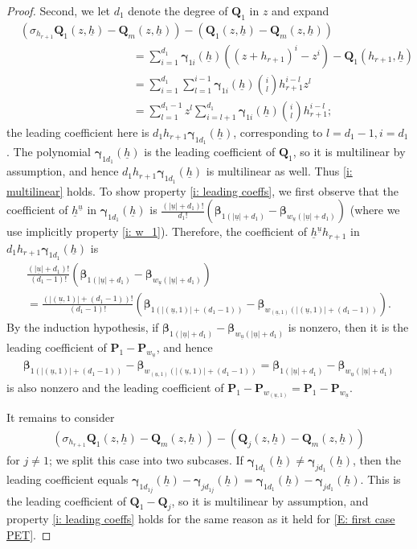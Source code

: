 \documentclass[11pt]{amsart}
\theoremstyle{definition}
\newcommand{\p}{{\mathbf{P}}}
\newcommand{\bq}{{\mathbf{Q}}}
\newcommand{\q}{{\mathbf{Q}}}
\newcommand{\bgamma}{{\boldsymbol{\gamma}}}
\newcommand{\bbeta}{{\boldsymbol{\beta}}}
\newcommand{\uh}{{\underline{h}}}
\newcommand{\uu}{{\underline{u}}}
\newcommand{\brac}[1]{\mathopen{}\left( #1 \mathclose{}\right)}
\begin{document}
\begin{proof}
        Second, we let $d_1$ denote the degree of $\q_1$ in $z$ and expand
    \begin{align}\label{E: second case PET}
        &(\sigma_{h_{r+1}}{\q}_1(z,\uh)-{\q}_m(z,\uh)) - ({\q}_1(z,\uh)-{\q}_m(z,\uh))\\ 
        \nonumber &\qquad\qquad\qquad\qquad\qquad= \sum_{i=1}^{d_1}\bgamma_{1i}(\uh)\brac{(z+h_{r+1})^i-z^i}-\bq_1(h_{r+1}, \uh)\\
        \nonumber &\qquad\qquad\qquad\qquad\qquad= \sum_{i=1}^{d_1}\sum_{l=1}^{i-1}\bgamma_{1i}(\uh){{{i}\choose{l}}}h_{r+1}^{i-l}z^l\\
        \nonumber &\qquad\qquad\qquad\qquad\qquad= \sum_{l=1}^{d_1-1}z^l \sum_{i=l+1}^{d_1}\bgamma_{1i}(\uh){{{i}\choose{l}}}h_{r+1}^{i-l};
    \end{align}
        the leading coefficient here is $d_1h_{r+1} \bgamma_{1d_1}(\uh)$, corresponding to $l=d_1-1, i=d_1$. The polynomial $\bgamma_{1d_1}(\uh)$ is the leading coefficient of $\bq_1$, so it is multilinear by assumption, and hence $d_1h_{r+1} \bgamma_{1d_1}(\uh)$ is multilinear as well. Thus \eqref{i: multilinear} holds. To show property \eqref{i: leading coeffs}, we first observe that the coefficient of $\uh^\uu$ in $\bgamma_{1d_1}(\uh)$ is $\frac{(|\uu|+d_1)!}{d_1!} (\bbeta_{1(|\uu|+d_1)}-\bbeta_{w_{\uu}(|\uu|+d_1)})$ (where we use implicitly property \eqref{i: w_1}). Therefore, the coefficient of $\uh^\uu h_{r+1}$ in $d_1h_{r+1} \bgamma_{1d_1}(\uh)$ is
        \begin{multline*}
            \frac{(|\uu|+d_1)!}{(d_1-1)!} (\bbeta_{1(|\uu|+d_1)}-\bbeta_{w_{\uu}(|\uu|+d_1)})\\
            = \frac{(|(\uu,1)|+(d_1-1))!}{(d_1-1)!} (\bbeta_{1(|(\uu,1)|+(d_1-1))}-\bbeta_{w_{(\uu,1)}(|(\uu,1)|+(d_1-1))}).
        \end{multline*}
        By the induction hypothesis, if $\bbeta_{1(|\uu|+d_1)}-\bbeta_{w_{\uu}(|\uu|+d_1)}$ is nonzero, then it is the leading coefficient of $\p_1-\p_{w_{\uu}}$, and hence
        \begin{align*}
            \bbeta_{1(|(\uu,1)|+(d_1-1))}-\bbeta_{w_{(\uu,1)}(|(\uu,1)|+(d_1-1))} = \bbeta_{1(|\uu|+d_1)}-\bbeta_{w_{\uu}(|\uu|+d_1)}
        \end{align*}
        is also nonzero and the leading coefficient of $\p_1 - \p_{w_{(\uu,1)}} = \p_1 - \p_{w_{\uu}}$.
        
        It remains to consider
        \begin{align*}
            (\sigma_{h_{r+1}}{\q}_1(z,\uh)-{\q}_m(z,\uh)) - ({\q}_j(z,\uh)-{\q}_m(z,\uh))
        \end{align*}
        {for $j \neq 1$}; we split this case into two subcases. If $\bgamma_{1 d_1}(\uh)\neq \bgamma_{jd_1}(\uh)$, then the leading coefficient equals $\bgamma_{1d_{1j}}(\uh)-\bgamma_{jd_{1j}}(\uh) = \bgamma_{1 d_1}(\uh)-\bgamma_{jd_1}(\uh)$. This is the leading coefficient of $\q_1 - \q_j$, so it is multilinear by assumption, and property \eqref{i: leading coeffs} holds for the same reason as it held for \eqref{E: first case PET}.
        

\end{proof}
\end{document}
